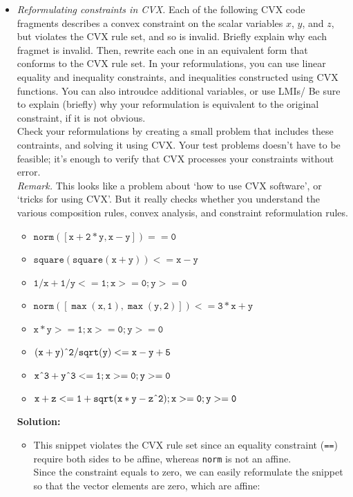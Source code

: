 \documentclass{article}
\newcommand{\caret}{\text{\^{}}}
\begin{document}
\begin{itemize}
  \item[1.] \textit{Reformulating constraints in CVX.} Each of the following CVX code fragments describes a convex constraint on the scalar variables $x$, $y$, and $z$, but violates the CVX rule set, and so is invalid. Briefly explain why each fragmet is invalid. Then, rewrite each one in an equivalent form that conforms to the CVX rule set. In your reformulations, you can use linear equality and inequality constraints, and inequalities constructed using CVX functions. You can also introudce additional variables, or use LMIs/ Be sure to explain (briefly) why your reformulation is equivalent to the original constraint, if it is not obvious. \\
  Check your reformulations by creating a small problem that includes these contraints, and solving it using CVX. Your test problems doesn't have to be feasible; it's enough to verify that CVX processes your constraints without error. \\
  \textit{Remark.} This looks like a problem about `how to use CVX software', or `tricks for using CVX'. But it really checks whether you understand the various composition rules, convex analysis, and constraint reformulation rules.
  \begin{itemize}
    \item[1.] $\mathtt{norm([x + 2*y, x - y]) == 0}$
    \item[2.] $\mathtt{square(square(x + y)) <= x - y}$
    \item[3.] $\mathtt{1/x + 1/y <= 1; x >= 0; y >= 0}$
    \item[4.] $\mathtt{norm([\max(x, 1), \max(y, 2)]) <= 3*x + y}$
    \item[5.] $\mathtt{x*y >= 1; x>= 0; y >= 0}$
    \item[6.] $\mathtt{(x + y)\caret{2}/sqrt(y) <= x - y + 5}$
    \item[7.] $\mathtt{x\caret{3} + y\caret{3} <= 1; x >= 0; y >= 0}$
    \item[8.] $\mathtt{x + z <= 1 + sqrt(x*y - z\caret{2}); x >= 0; y >= 0}$
  \end{itemize}
  \textbf{Solution:}
  \begin{itemize}
    \item[1.] This snippet violates the CVX rule set since an equality constraint (\texttt{==}) require both sides to be affine, whereas \texttt{norm} is not an affine. \\
    Since the constraint equals to zero, we can easily reformulate the snippet so that the vector elements are zero, which are affine:

\end{itemize}
\end{itemize}
\end{document}
